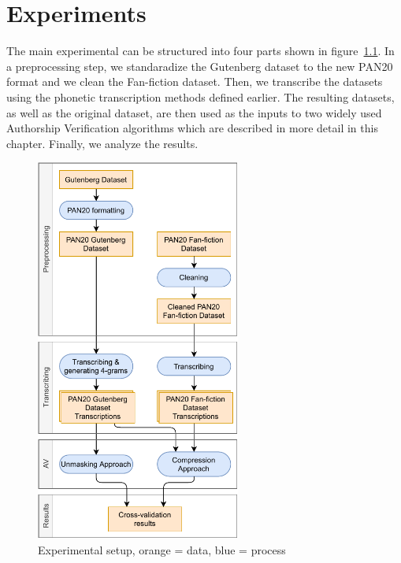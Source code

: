 \chapter{Experiments}\label{experiments}
The main experimental can be structured into four parts shown in figure~\ref{fig:process}.
In a preprocessing step, we standaradize the Gutenberg dataset to the new PAN20 format and we clean the Fan-fiction dataset.
Then, we transcribe the datasets using the phonetic transcription methods defined earlier.
The resulting datasets, as well as the original dataset, are then used as the inputs to two widely used Authorship Verification algorithms which are described in more detail in this chapter.
Finally, we analyze the results.

\begin{figure}
  \centering
  \includegraphics[width=0.6\textwidth]{figures/process}
  \caption{Experimental setup, orange = data, blue = process}
  \label{fig:process}
\end{figure}

